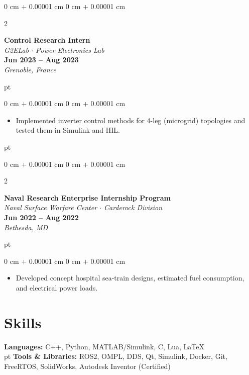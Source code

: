 \documentclass[10pt, letterpaper]{extarticle}
\newenvironment{highlights}{
    \begin{itemize}[
        topsep=0 pt,
        parsep=0 pt, 
        partopsep=0pt,
        itemsep=0pt,
        leftmargin=0.25 cm + 10pt
        ]
    }{
\end{itemize}
} %
\newenvironment{onecolentry}{
    \begin{adjustwidth}{
            0 cm + 0.00001 cm
        }{
            0 cm + 0.00001 cm
        }
    }{
    \end{adjustwidth}
} %
\newenvironment{twocolentry}[2][]{
    \onecolentry
    \def\secondColumn{#2}
    \setcolumnwidth{\fill, 4.5 cm}
    \begin{paracol}{2}
    }{
        \switchcolumn \raggedleft \secondColumn
    \end{paracol}
    \endonecolentry
} %
\begin{document}
\begin{twocolentry}{\textbf{Jun 2023 -- Aug 2023}\\ \textit{Grenoble, France}}
    \textbf{Control Research Intern}\\
    \textit{G2ELab $\cdot$ Power Electronics Lab}\\
\end{twocolentry}
 pt%
\begin{onecolentry}
    \begin{highlights}
    \item Implemented inverter control methods for 4-leg (microgrid) topologies and tested them in Simulink and HIL.
    \end{highlights}
\end{onecolentry}
 pt%

\begin{twocolentry}{\textbf{Jun 2022 -- Aug 2022}\\\textit{Bethesda, MD}}
    \textbf{Naval Research Enterprise Internship Program}\\
    \textit{Naval Surface Warfare Center $\cdot$ Carderock Division}\\
\end{twocolentry}
 pt%
\begin{onecolentry}
    \begin{highlights}
    \item Developed concept hospital sea-train designs, estimated fuel consumption, and electrical power loads.
    \end{highlights}
\end{onecolentry}

\section{Skills}
\textbf{Languages: } C++, Python, MATLAB/Simulink, C, Lua, \LaTeX \\
 pt%
\textbf{Tools \& Libraries: } ROS2, OMPL, DDS, Qt, Simulink, Docker, Git, FreeRTOS, SolidWorks, Autodesk Inventor (Certified)\\
\end{document}

